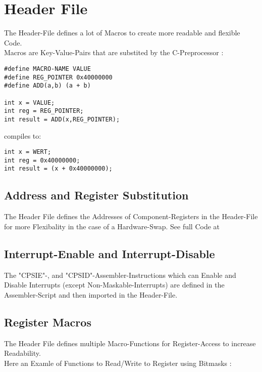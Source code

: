 
\section{Header File}

The Header-File defines a lot of Macros to create more readable and flexible Code.\\
Macros are Key-Value-Pairs that are substited by the C-Preprocessor :

\begin{lstlisting}[language=Clang,caption=Macro Defintion Example]
#define MACRO-NAME VALUE
#define REG_POINTER 0x40000000
#define ADD(a,b) (a + b)

int x = VALUE;
int reg = REG_POINTER;
int result = ADD(x,REG_POINTER);
\end{lstlisting}
\vspace{-25px}
\begin{center}
	\Large compiles to:
\end{center}
\begin{lstlisting}[language=Clang,caption=Substitued Values]
int x = WERT;
int reg = 0x40000000;
int result = (x + 0x40000000);
\end{lstlisting}

\subsection{Address and Register Substitution}

The Header File defines the Addresses of Component-Registers in the Header-File for more Flexibality in the case of a Hardware-Swap.
See full Code at 



\subsection{Interrupt-Enable and Interrupt-Disable}

The "CPSIE"-, and "CPSID"-Assembler-Instructions which can Enable and Disable Interrupts (except Non-Maskable-Interrupts) are defined in the Assembler-Script and then imported in the Header-File.





\subsection{Register Macros}

The Header File defines multiple Macro-Functions for Register-Access to increase Readability.\\
Here an Examle of Functions to Read/Write to Register using Bitmasks :


